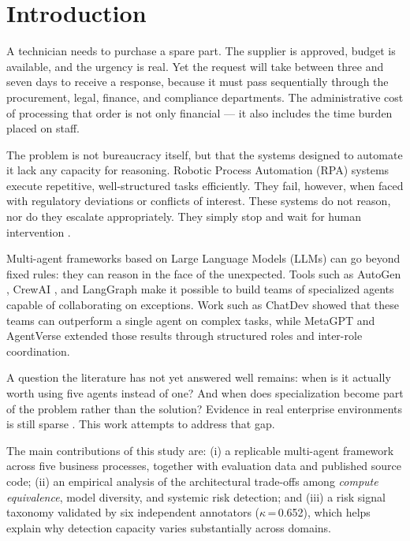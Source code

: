 \documentclass[preprint,12pt,numrefs]{elsarticle}
\begin{document}
\section{Introduction}
\label{sec:introduccion}

A technician needs to purchase a spare part. The supplier is approved,
budget is available, and the urgency is real. Yet the request will take
between three and seven days to receive a response, because it must pass
sequentially through the procurement, legal, finance, and compliance
departments. The administrative cost of processing that order is not
only financial --- it also includes the time burden placed on staff.

The problem is not bureaucracy itself, but that the systems designed to
automate it lack any capacity for reasoning. Robotic Process Automation
(RPA) systems execute repetitive, well-structured tasks efficiently.
They fail, however, when faced with regulatory deviations or conflicts
of interest. These systems do not reason, nor do they escalate
appropriately. They simply stop and wait for human intervention
\citep{Aguirre2017rpa}.

Multi-agent frameworks based on Large Language Models (LLMs) can go
beyond fixed rules: they can reason in the face of the unexpected.
Tools such as AutoGen \citep{wu2023autogen}, CrewAI \citep{crewai2024},
and LangGraph \citep{LangGraph2024} make it possible to build teams of
specialized agents capable of collaborating on exceptions. Work such as
ChatDev \citep{qian2023chatdev} showed that these teams can outperform
a single agent on complex tasks, while MetaGPT \citep{Hong2024metagpt}
and AgentVerse \citep{Chen2023agentverse} extended those results through
structured roles and inter-role coordination.

A question the literature has not yet answered well remains: when is it
actually worth using five agents instead of one? And when does
specialization become part of the problem rather than the solution?
Evidence in real enterprise environments is still sparse
\citep{Wang2024survey}. This work attempts to address that gap.

The main contributions of this study are: (i) a replicable multi-agent
framework across five business processes, together with evaluation data
and published source code; (ii) an empirical analysis of the
architectural trade-offs among \emph{compute equivalence}, model
diversity, and systemic risk detection; and (iii) a risk signal taxonomy
validated by six independent annotators ($\kappa$\,=\,0.652), which
helps explain why detection capacity varies substantially across domains.
\end{document}

